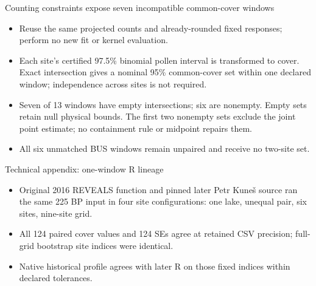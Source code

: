 \begin{frame}{Counting constraints expose seven incompatible common-cover windows}
\small
\begin{itemize}
\item Reuse the same projected counts and already-rounded fixed responses; perform no new fit or kernel evaluation.
\item Each site's certified 97.5\% binomial pollen interval is transformed to cover. Exact intersection gives a nominal 95\% common-cover set within one declared window; independence across sites is not required.
\item Seven of 13 windows have empty intersections; six are nonempty. Empty sets retain null physical bounds. The first two nonempty sets exclude the joint point estimate; no containment rule or midpoint repairs them.
\item All six unmatched BUS windows remain unpaired and receive no two-site set.
\end{itemize}
\end{frame}

\begin{frame}{Technical appendix: one-window R lineage}
\small
\begin{itemize}
\item Original 2016 REVEALS function and pinned later Petr Kune\v{s} source ran the same 225 BP input in four site configurations: one lake, unequal pair, six sites, nine-site grid.
\item All 124 paired cover values and 124 SEs agree at retained CSV precision; full-grid bootstrap site indices were identical.
\item Native historical profile agrees with later R on those fixed indices within declared tolerances.
\end{itemize}
\end{frame}

